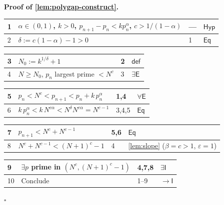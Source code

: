 \documentclass[11pt,reqno]{amsart}
\theoremstyle{blueplain}
\renewcommand{\qedsymbol}{\textcolor{proofqed}{\ensuremath{\square}}}
\renewenvironment{proof}[1][Proof]{\par\noindent\textbf{\textcolor{proofhead}{#1.}}\par\nobreak}{\par\nobreak\hfill\qedsymbol}
\numberwithin{equation}{section}
\begin{document}
\begin{proof}[\textbf{Proof of \cref{lem:polygap-construct}}]
	\label{proof:lem:polygap-construct}
	{\scriptsize
		\begin{tabular}{|m{0.7cm}|m{12cm}|m{1.4cm}|m{2.5cm}|}
			\hline
			1 & $\alpha\in(0,1)$, $k>0$, $p_{n+1}-p_n<kp_n^\alpha$, $c>1/(1-\alpha)$ & --- & $\mathsf{Hyp}$ \\ \hline
			2 & $\delta:=c(1-\alpha)-1>0$ & 1 & $\mathsf{Eq}$ \\
		\end{tabular}%
		\noindent \newline
		\noindent
		\begin{tabular}{|m{0.7cm}|m{12cm}|m{1.4cm}|m{2.5cm}|}
			\hline
			3 & $N_0:=k^{1/\delta}+1$ & 2 & $\mathsf{def}$ \\ \hline
			4 & $N\ge N_0$, $p_n$ largest prime $<N^c$ & 3 & $\exists\mathsf{E}$ \\
		\end{tabular}%
		\noindent \newline
		\noindent
		\begin{tabular}{|m{0.7cm}|m{12cm}|m{1.4cm}|m{2.5cm}|}
			\hline
			5 & $p_n<N^c<p_{n+1}<p_n+k\,p_n^\alpha$ & 1,4 & $\forall\mathsf{E}$ \\ \hline
			6 & $k\,p_n^\alpha<k\,N^{c\alpha}<N^{\delta}N^{c\alpha}=N^{c-1}$ & 3,4,5 & $\mathsf{Eq}$ \\
		\end{tabular}%
		\noindent \newline
		\noindent
		\begin{tabular}{|m{0.7cm}|m{12cm}|m{1.4cm}|m{2.5cm}|}
			\hline
			7 & $p_{n+1}<N^c+N^{c-1}$ & 5,6 & $\mathsf{Eq}$ \\ \hline
			8 & $N^c+N^{c-1}<(N+1)^c-1$ & 4 & \cref{lem:slope} ($\beta=c>1$, $\varepsilon=1$) \\
		\end{tabular}%
		\noindent \newline
		\noindent
		\begin{tabular}{|m{0.7cm}|m{12cm}|m{1.4cm}|m{2.5cm}|}
			\hline
			9 & $\exists p$ prime in $(N^c,(N+1)^c-1)$ & 4,7,8 & $\exists\mathsf{I}$ \\ \hline
			10 & Conclude & 1--9 & $\rightarrow\mathsf{I}$ \\ \hline
		\end{tabular}%
	}
\end{proof}

\end{document}
